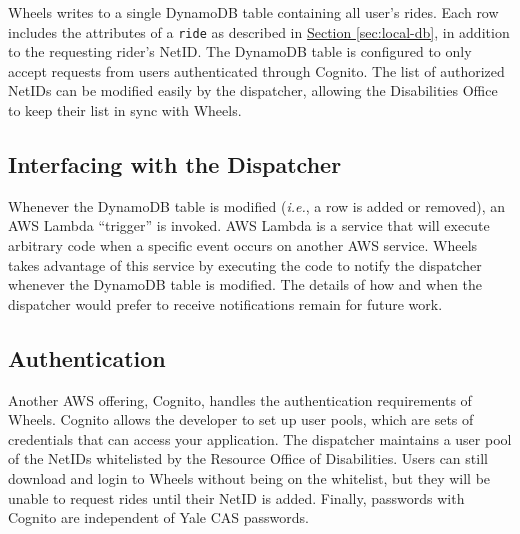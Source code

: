 \documentclass[12pt, a4paper]{article}
\begin{document}
\begin{multicols*}{2}
Wheels writes to a single DynamoDB table containing all user's rides. Each row includes the attributes of a \texttt{ride} as described in \hyperref[sec:local-db]{Section \ref{sec:local-db}}, in addition to the requesting rider's NetID. The DynamoDB table is configured to only accept requests from users authenticated through Cognito. The list of authorized NetIDs can be modified easily by the dispatcher, allowing the Disabilities Office to keep their list in sync with Wheels.
\subsection{Interfacing with the Dispatcher}
Whenever the DynamoDB table is modified (\textit{i.e.}, a row is added or removed), an AWS Lambda ``trigger'' is invoked. AWS Lambda is a service that will execute arbitrary code when a specific event occurs on another AWS service. Wheels takes advantage of this service by executing the code to notify the dispatcher whenever the DynamoDB table is modified. The details of how and when the dispatcher would prefer to receive notifications remain for future work.

\subsection{Authentication}
Another AWS offering, Cognito, handles the authentication requirements of Wheels. Cognito allows the developer to set up user pools, which are sets of credentials that can access your application. The dispatcher maintains a user pool of the NetIDs whitelisted by the Resource Office of Disabilities. Users can still download and login to Wheels without being on the whitelist, but they will be unable to request rides until their NetID is added. Finally, passwords with Cognito are independent of Yale CAS passwords.


\end{multicols*}
\end{document}
